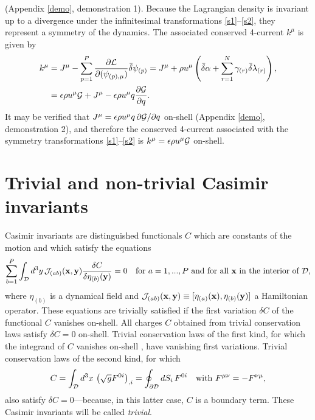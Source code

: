 \documentclass{article}
\numberwithin{equation}{section}
\begin{document}
(Appendix \ref{demo}, demonstration 1). Because the Lagrangian density is invariant up to a divergence under the infinitesimal transformations \eqref{s1}--\eqref{s2}, they represent a symmetry of the dynamics. The associated conserved 4-current $k^\mu$ is given by
\begin{align}
k^\mu &= J^\mu - \sum_{p=1}^P \frac{\partial{\cal L}}{\partial (\psi_{(p),\mu})} \bar\delta\psi_{(p)}=J^\mu+\rho u^\mu \left( \bar\delta\alpha+\sum_{r=1}^N \gamma_{(r)}\bar\delta\lambda_{(r)} \right), \nonumber \\
&=\epsilon\rho u^\mu {\cal G} + J^\mu-\epsilon\rho u^\mu q\frac{\partial{\cal G}}{\partial q}.
\end{align}
It may be verified that $J^\mu=\epsilon\rho u^\mu q\,\partial{\cal G}/\partial q$ on-shell (Appendix \ref{demo}, demonstration 2), and therefore the conserved 4-current associated with the symmetry transformations \eqref{s1}--\eqref{s2} is $k^\mu=\epsilon\rho u^\mu{\cal G}$ on-shell.

\section{Trivial and non-trivial Casimir invariants}\label{trin}
Casimir invariants are distinguished functionals $C$ \citep{Olver93} which are constants of the motion and which satisfy the equations
\begin{align}
\sum_{b=1}^P\int_{\cal D} d^3y \,{\cal J}_{(ab)}({\mathbf x},{\mathbf y})\frac{\delta C}{\delta\eta_{(b)}({\mathbf y})}=0 \quad\text{for } a=1,...,P \text{ and for all $\mathbf x$ in the interior of $\cal D$,}
\end{align}
where $\eta_{(b)}$ is a dynamical field and ${\cal J}_{(ab)}({\mathbf x},{\mathbf y}) \equiv [\eta_{(a)}({\mathbf x}),\eta_{(b)}({\mathbf y})]$ a Hamiltonian operator. These equations are trivially satisfied if the first variation $\delta C$ of the functional $C$ vanishes on-shell. All charges $C$ obtained from trivial conservation laws satisfy $\delta C=0$ on-shell. Trivial conservation laws of the first kind, for which the integrand of $C$ vanishes on-shell \citep{Olver93}, have vanishing first variations. Trivial conservation laws of the second kind, for which
\begin{align}
C=\int_{\cal D} d^3x\,\left(\sqrt{g}F^{0i}\right)_{,i}=\oint_{\partial{\cal D}} dS_i \,F^{0i} \quad\text{with } F^{\mu\nu}=-F^{\nu\mu},
\end{align}
also satisfy $\delta C=0$---because, in this latter case, $C$ is a boundary term. These Casimir invariants will be called {\it trivial}.
\end{document}
